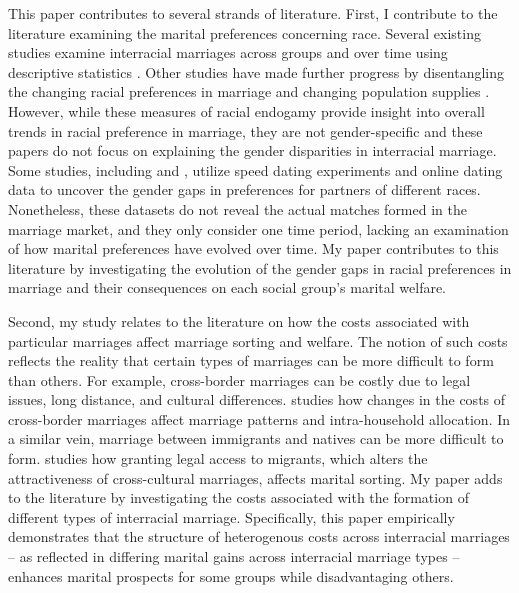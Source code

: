 This paper contributes to several strands of literature. First, I contribute to the literature examining the marital preferences concerning race. Several existing studies examine interracial marriages across groups and over time using descriptive statistics \citep{Fryer_2007_InterracialMarriagel, PewResearch_2017_InterracialMarriage}. Other studies have made further progress by disentangling the changing racial preferences in marriage and changing population supplies \citep{FuHeaton_2008_RacialEducationalHomogamy, QianLichter_2011_InterracialMarriage, CiscatoWeber_2020_EvolvingMaritalPreferences, AnderbergVickery_2021_EthnicMaritalSortingUK}. However, while these measures of racial endogamy provide insight into overall trends in racial preference in marriage, they are not gender-specific and these papers do not focus on explaining the gender disparities in interracial marriage. Some studies, including \cite{Fismanetal_2008_SpeedDating} and \cite{HitschHortacsuAriely_2010_OnlineDating}, utilize speed dating experiments and online dating data to uncover the gender gaps in preferences for partners of different races. Nonetheless, these datasets do not reveal the actual matches formed in the marriage market, and they only consider one time period, lacking an examination of how marital preferences have evolved over time. My paper contributes to this literature by investigating the evolution of the gender gaps in racial preferences in marriage and their consequences on each social group's marital welfare. 

Second, my study relates to the literature on how the costs associated with particular marriages affect marriage sorting and welfare. The notion of such costs reflects the reality that certain types of marriages can be more difficult to form than others. For example, cross-border marriages can be costly due to legal issues, long distance, and cultural differences. \cite{Ahn_2022_MatchingAcrossMarkets} studies how changes in the costs of cross-border marriages affect marriage patterns and intra-household allocation. In a similar vein, marriage between immigrants and natives can be more difficult to form. \cite{Addaetal_2022_LegalStatusCulturalDistance} studies how granting legal access to migrants, which alters the attractiveness of cross-cultural marriages, affects marital sorting. My paper adds to the literature by investigating the costs associated with the formation of different types of interracial marriage. Specifically, this paper empirically demonstrates that the structure of heterogenous costs across interracial marriages -- as reflected in differing marital gains across interracial marriage types -- enhances marital prospects for some groups while disadvantaging others.


